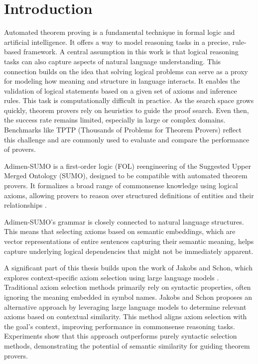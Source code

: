\documentclass[english,version-2020-11]{uzl-thesis}
\begin{document}
%
%

\chapter{Introduction}
\label{chapter-introduction}

Automated theorem proving is a fundamental technique in formal logic and artificial intelligence. It offers a way to model reasoning tasks in a precise, rule-based framework. A central assumption in this work is that logical reasoning tasks can also capture aspects of natural language understanding. This connection builds on the idea that solving logical problems can serve as a proxy for modeling how meaning and structure in language interacts. It enables the validation of logical statements based on a given set of axioms and inference rules. This task is computationally difficult in practice. As the search space grows quickly, theorem provers rely on heuristics to guide the proof search. Even then, the success rate remains limited, especially in large or complex domains. Benchmarks like TPTP (Thousands of Problems for Theorem Provers) reflect this challenge and are commonly used to evaluate and compare the performance of provers.

Adimen-SUMO is a first-order logic (FOL) reengineering of the Suggested Upper Merged Ontology (SUMO), designed to be compatible with automated theorem provers. It formalizes a broad range of commonsense knowledge using logical axioms, allowing provers to reason over structured definitions of entities and their relationships \cite{Alvez2014}.

Adimen-SUMO’s grammar is closely connected to natural language structures. This means that selecting axioms based on semantic embeddings, which are vector representations of entire sentences capturing their semantic meaning, helps capture underlying logical dependencies that might not be immediately apparent.

A significant part of this thesis builds upon the work of Jakobs and Schon, which explores context-specific axiom selection using large language models \cite{Schon2024}. Traditional axiom selection methods primarily rely on syntactic properties, often ignoring the meaning embedded in symbol names. Jakobs and Schon proposes an alternative approach by leveraging large language models to determine relevant axioms based on contextual similarity. This method aligns axiom selection with the goal's context, improving performance in commonsense reasoning tasks. Experiments show that this approach outperforms purely syntactic selection methods, demonstrating the potential of semantic similarity for guiding theorem provers.
\end{document}
